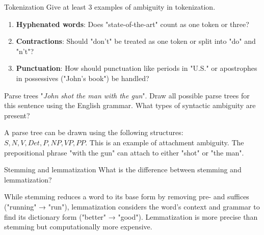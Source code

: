 \documentclass{article}
\begin{document}
\setcounter{section}{2022}

\begin{exercise}{Tokenization}
  Give at least 3 examples of ambiguity in tokenization.

  \begin{solution}
    \begin{enumerate}
        \item \textbf{Hyphenated words}: Does "state-of-the-art" count as one token or three?
        \item \textbf{Contractions}: Should "don't" be treated as one token or split into "do" and "n't"?
        \item \textbf{Punctuation}: How should punctuation like periods in "U.S." or apostrophes in possessives ("John's book") be handled?
    \end{enumerate}
  \end{solution}
\end{exercise}

\begin{exercise}{Parse trees}
  "\textit{John shot the man with the gun}". Draw all possible parse trees for this sentence using the English grammar. What types of syntactic ambiguity are present?

  \begin{solution}
    A parse tree can be drawn using the following structures: $S, N, V, Det, P, NP, VP, PP$. This is an example of attachment ambiguity. The prepositional phrase "with the gun" can attach to either "shot" or "the man".
  \end{solution}
\end{exercise}

\begin{exercise}{Stemming and lemmatization}
  What is the difference between stemming and lemmatization?

  \begin{solution}
    While stemming reduces a word to its base form by removing pre- and suffices ("running" → "run"), lemmatization considers the word's context and grammar to find its dictionary form ("better" → "good"). Lemmatization is more precise than stemming but computationally more expensive.
  \end{solution}
\end{exercise}
\end{document}
